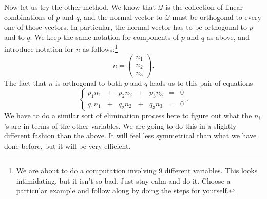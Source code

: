 \documentclass[00-livre-main.tex]{subfiles}
\begin{document}
Now let us try the other method. We know that $\mathcal{Q}$ is the collection of linear combinations of $p$ and $q$, and the normal vector to $\mathcal{Q}$ must be orthogonal to every one of those vectors. In particular, the normal vector has to be orthogonal to $p$ and to $q$. We keep the same notation for components of $p$ and $q$ as above, and introduce notation for $n$ as follows:\footnote{We are about to do a computation involving $9$ different variables. This looks intimidating, but it isn't so bad. Just stay calm and do it. Choose a particular example and follow along by doing the steps for yourself.}
\[
n = \begin{pmatrix} n_1 \\ n_2 \\ n_3 \end{pmatrix} .
\]
The fact that $n$ is orthogonal to both $p$ and $q$ leads us to this pair of equations
\[
\left\{ \begin{array}{rrrrrrr}
p_1 n_1 & + & p_2 n_2 & + & p_3 n_3 & = & 0 \\
q_1 n_1 & + & q_2 n_2 & + & q_3 n_3 & = & 0 
\end{array}\right. .
\]
We have to do a similar sort of elimination process here to figure out what the $n_i$'s are in terms of the other variables. We are going to do this in a slightly different fashion than the above. It will feel less symmetrical than what we have done before, but it will be very efficient.
\end{document}
